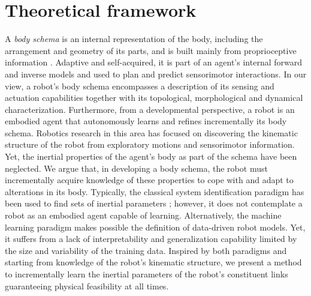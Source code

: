 \section{Theoretical framework}\label{sec:theoretical_framework}
A \emph{body schema} is an internal representation of the body, including the arrangement and geometry of its parts, and is built mainly from proprioceptive information \cite{Hoffmann2010Bodyschemarobotics,Morasso2015Revisitingbodyschema}. Adaptive and self-acquired, it is part of an agent's internal forward and inverse models and used to plan and predict sensorimotor interactions. In our view, a robot's body schema encompasses a description of its sensing and actuation capabilities together with its topological, morphological and dynamical characterization. Furthermore, from a developmental perspective, a robot is an embodied agent that autonomously learns and refines incrementally its body schema. Robotics research in this area has focused on discovering the kinematic structure of the robot from exploratory motions and sensorimotor information\cite{Stoytchev2003Computationalmodelextendable, Hart2010RoboticSelfModels, Mathew2014learningbasedapproach, Hoffmann2014Minimallycognitiverobotics, Shoushtari2016Robotbodyself}. Yet, the inertial properties of the agent's body as part of the schema have been neglected. We argue that, in developing a body schema, the robot must incrementally acquire knowledge of these properties to cope with and adapt to alterations in its body. Typically, the classical system identification paradigm has been used to find sets of inertial parameters \cite{Swevers2007Dynamicmodelidentification}; however, it does not contemplate a robot as an embodied agent capable of learning. Alternatively, the machine learning paradigm makes possible the definition of data-driven robot models. Yet, it suffers from a lack of interpretability \cite{Murdoch2019Definitionsmethodsapplications,Rudin2019Stopexplainingblack} and generalization capability limited by the size and variability of the training data. Inspired by both paradigms and starting from knowledge of the robot's kinematic structure, we present a method to incrementally learn the inertial parameters of the robot's constituent links guaranteeing physical feasibility at all times.





